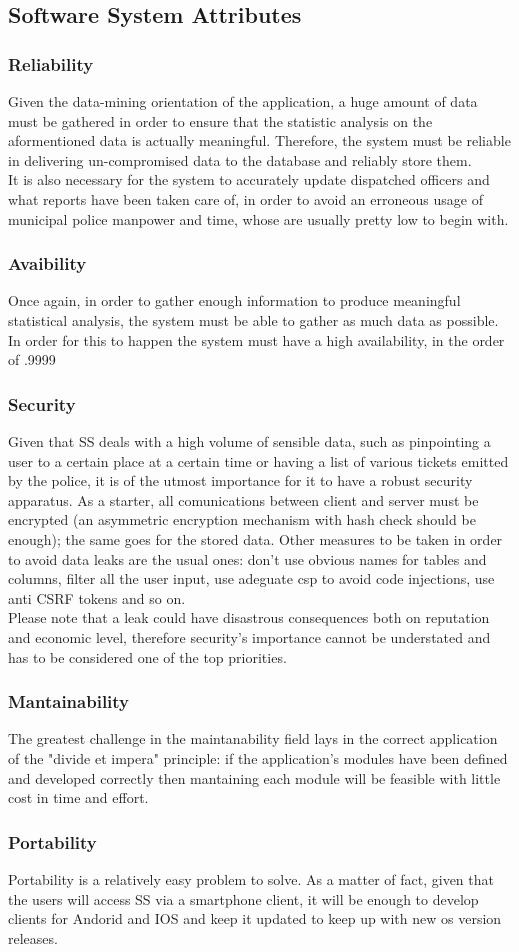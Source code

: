 \subsection{Software System Attributes}
	\subsubsection{Reliability}
	Given the data-mining orientation of the application, a huge amount of data must be gathered in order to ensure that the statistic analysis on the aformentioned data is actually meaningful. Therefore, the system must be reliable in delivering un-compromised data to the database and reliably store them.\\
	It is also necessary for the system to accurately update dispatched officers and what reports have been taken care of, in order to avoid an erroneous usage of municipal police manpower and time, whose are usually pretty low to begin with.
	\subsubsection{Avaibility}
	Once again, in order to gather enough information to produce meaningful statistical analysis, the system must be able to gather as much data as possible. In order for this to happen the system must have a high availability, in the order of .9999
	\subsubsection{Security}
	Given that SS deals with a high volume of sensible data, such as pinpointing a user to a certain place at a certain time or having a list of various tickets emitted by the police, it is of the utmost importance for it to have a robust security apparatus. As a starter, all comunications between client and server must be encrypted (an asymmetric encryption mechanism with hash check should be enough); the same goes for the stored data. Other measures to be taken in order to avoid data leaks are the usual ones: don't use obvious names for tables and columns, filter all the user input, use adeguate csp to avoid code injections, use anti CSRF tokens and so on.\\
	Please note that a leak could have disastrous consequences both on reputation and economic level, therefore security's importance cannot be understated and has to be considered one of the top priorities. 
	\subsubsection{Mantainability}
	The greatest challenge in the maintanability field lays in the correct application of the "divide et impera" principle: if the application's modules have been defined and developed correctly then mantaining each module will be feasible with little cost in time and effort.
	\subsubsection{Portability}
	Portability is a relatively easy problem to solve. As a matter of fact, given that the users will access SS via a smartphone client, it will be enough to develop clients for Andorid and IOS and keep it updated to keep up with new os version releases. 
